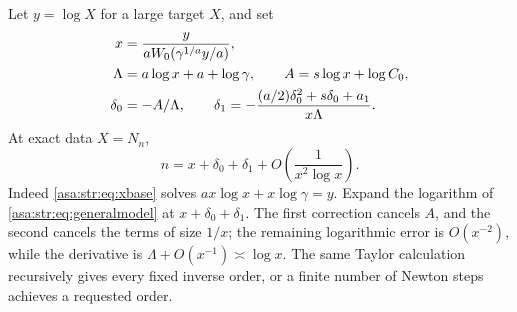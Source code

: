 \documentclass[11pt,letterpaper]{article}
\theoremstyle{remark}\newtheorem{remark}[theorem]{Remark}
\numberwithin{equation}{section}
\begin{document}
Let $y=\log X$ for a large target $X$, and set
\begin{align}
 x&=\frac{y}{aW_0(\gamma^{1/a}y/a)},\label{asa:str:eq:xbase}\\
 \Lambda&=a\log x+a+\log\gamma,\qquad A=s\log x+\log C_0,\notag\\
 \delta_0&=-A/\Lambda,\qquad
 \delta_1=-\frac{(a/2)\delta_0^2+s\delta_0+a_1}{x\Lambda}.\label{asa:str:eq:delta}
\end{align}
At exact data $X=N_n$,
\begin{equation}\label{asa:str:eq:inverse2}
 n=x+\delta_0+\delta_1+O\left(\frac1{x^2\log x}\right).
\end{equation}
Indeed \eqref{asa:str:eq:xbase} solves $a x\log x+x\log\gamma=y$. Expand the logarithm of \eqref{asa:str:eq:generalmodel} at $x+\delta_0+\delta_1$. The first correction cancels $A$, and the second cancels the terms of size $1/x$; the remaining logarithmic error is $O(x^{-2})$, while the derivative is $\Lambda+O(x^{-1})\asymp\log x$. The same Taylor calculation recursively gives every fixed inverse order, or a finite number of Newton steps achieves a requested order.
\end{document}
